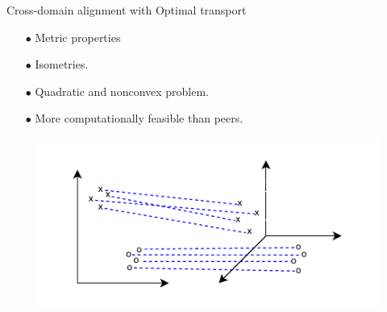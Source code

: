 \documentclass{beamer}
\begin{document}
\begin{frame}{Cross-domain alignment with Optimal transport}
\vspace{-0.3cm}
\begin{minipage}[t]{0.5\linewidth}
\begin{itemize}
  \item[$\bullet$] Metric properties
  \item[$\bullet$] Isometries.
  \item[$\bullet$] Quadratic and nonconvex problem.
  \item[$\bullet$] More computationally feasible than peers.
\end{itemize}
\end{minipage}%
\hfill%
\hspace{-6cm}
\begin{minipage}[t]{0.55\linewidth}
\begin{figure}
  \centering
  \includegraphics[width=1.2\linewidth, keepaspectratio=true]{OT_new/gw.pdf}
\end{figure}
\end{minipage}

\end{frame}
\end{document}
